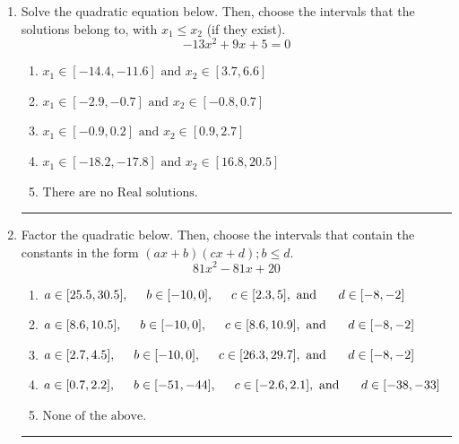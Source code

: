 \documentclass[14pt]{extbook}
\newcommand{\litem}[1]{\item#1\hspace*{-1cm}\rule{\textwidth}{0.4pt}}
\begin{document}
\begin{enumerate}
\litem{
Solve the quadratic equation below. Then, choose the intervals that the solutions belong to, with $x_1 \leq x_2$ (if they exist).\[ -13x^{2} +9 x + 5 = 0 \]\begin{enumerate}[label=\Alph*.]
\item \( x_1 \in [-14.4, -11.6] \text{ and } x_2 \in [3.7, 6.6] \)
\item \( x_1 \in [-2.9, -0.7] \text{ and } x_2 \in [-0.8, 0.7] \)
\item \( x_1 \in [-0.9, 0.2] \text{ and } x_2 \in [0.9, 2.7] \)
\item \( x_1 \in [-18.2, -17.8] \text{ and } x_2 \in [16.8, 20.5] \)
\item \( \text{There are no Real solutions.} \)

\end{enumerate} }
\litem{
Factor the quadratic below. Then, choose the intervals that contain the constants in the form $(ax+b)(cx+d); b \leq d.$\[ 81x^{2} -81 x + 20 \]\begin{enumerate}[label=\Alph*.]
\item \( a \in [25.5, 30.5], \hspace*{5mm} b \in [-10, 0], \hspace*{5mm} c \in [2.3, 5], \text{ and } \hspace*{5mm} d \in [-8, -2] \)
\item \( a \in [8.6, 10.5], \hspace*{5mm} b \in [-10, 0], \hspace*{5mm} c \in [8.6, 10.9], \text{ and } \hspace*{5mm} d \in [-8, -2] \)
\item \( a \in [2.7, 4.5], \hspace*{5mm} b \in [-10, 0], \hspace*{5mm} c \in [26.3, 29.7], \text{ and } \hspace*{5mm} d \in [-8, -2] \)
\item \( a \in [0.7, 2.2], \hspace*{5mm} b \in [-51, -44], \hspace*{5mm} c \in [-2.6, 2.1], \text{ and } \hspace*{5mm} d \in [-38, -33] \)
\item \( \text{None of the above.} \)


\end{enumerate}}
\end{enumerate}
\end{document}
